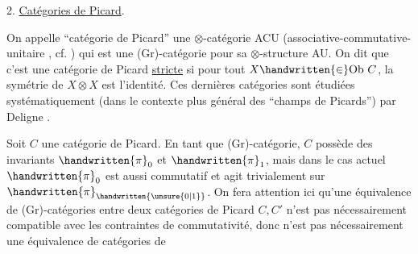 2. \uline{Catégories de Picard}.

On appelle ``catégorie de Picard'' une $\otimes$-catégorie ACU (associative-commutative-unitaire , cf. \handwritten{[\, ]}) qui est une (Gr)-catégorie pour sa  $\otimes$-structure AU. On dit que c'est une catégorie de Picard \uline{stricte} si pour tout $X\handwritten{\in}\mathrm{Ob}\ C$, la symétrie de $X\otimes X$ est l'identité. Ces  dernières catégories sont étudiées systématiquement (dans le contexte plus général des ``champs de Picards'') par Deligne \handwritten{[\, ]}.

Soit $C$ une catégorie de Picard. En tant que (Gr)-catégorie, $C$ possède des invariants $\handwritten{\pi}_{0}$ et $\handwritten{\pi}_{1}$, mais dans le cas actuel $\handwritten{\pi}_{0}$ est aussi commutatif et agit trivialement sur $\handwritten{\pi}_{\handwritten{\unsure{0|1}}}$. On fera attention ici qu'une équivalence de (Gr)-catégories entre deux catégories de Picard $C,C'$ n'est pas nécessairement compatible avec les contraintes de commutativité, donc n'est pas nécessairement une équivalence de catégories de
